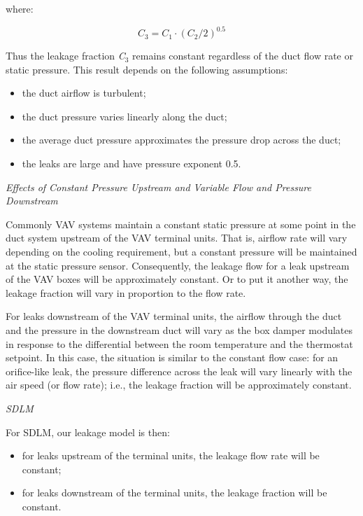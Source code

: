 where:

\begin{equation}
{C_3} = {C_1} \cdot {({C_2}/2)^{0.5}}
\end{equation}

Thus the leakage fraction \emph{C}\(_{3}\) remains constant regardless of the duct flow rate or static pressure. This result depends on the following assumptions:

\begin{itemize}
\item the duct airflow is turbulent;
\item the duct pressure varies linearly along the duct;
\item the average duct pressure approximates the pressure drop across the duct;
\item the leaks are large and have pressure exponent 0.5.
\end{itemize}

\emph{Effects of Constant Pressure Upstream and Variable Flow and Pressure Downstream}

Commonly VAV systems maintain a constant static pressure at some point in the duct system upstream of the VAV terminal units. That is, airflow rate will vary depending on the cooling requirement, but a constant pressure will be maintained at the static pressure sensor. Consequently, the leakage flow for a leak upstream of the VAV boxes will be approximately constant. Or to put it another way, the leakage fraction will vary in proportion to the flow rate.

For leaks downstream of the VAV terminal units, the airflow through the duct and the pressure in the downstream duct will vary as the box damper modulates in response to the differential between the room temperature and the thermostat setpoint. In this case, the situation is similar to the constant flow case: for an orifice-like leak, the pressure difference across the leak will vary linearly with the air speed (or flow rate); i.e., the leakage fraction will be approximately constant.

\emph{SDLM}

For SDLM, our leakage model is then:

\begin{itemize}
\item for leaks upstream of the terminal units, the leakage flow rate will be constant;
\item for leaks downstream of the terminal units, the leakage fraction will be constant.
\end{itemize}

